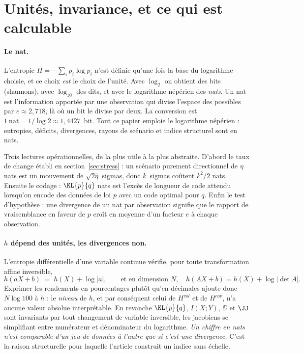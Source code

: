\appendix

\section{Unités, invariance, et ce qui est calculable}
\label{app:units}

\paragraph{Le nat.} L'entropie $H=-\sum_i p_i\log p_i$ n'est définie qu'une fois
la base du logarithme choisie, et ce choix \emph{est} le choix de l'unité. Avec
$\log_2$ on obtient des bits (shannons), avec $\log_{10}$ des dits, et avec le
logarithme népérien des \emph{nats}. Un nat est l'information apportée par une
observation qui divise l'espace des possibles par $e\approx2{,}718$, là où un bit
le divise par deux. La conversion est
$1~\text{nat}=1/\log 2\approx1{,}4427$~bit. Tout ce papier emploie le logarithme
népérien : entropies, déficits, divergences, rayons de scénario et indice
structurel sont en nats.

Trois lectures opérationnelles, de la plus utile à la plus abstraite. D'abord le
taux de change établi en section~\ref{sec:stress} : un scénario purement
directionnel de $\eta$ nats est un mouvement de $\sqrt{2\eta}$ sigmas, donc
$k$~sigmas coûtent $k^2/2$ nats. Ensuite le codage : $\KL{p}{q}$ nats est
l'excès de longueur de code attendu lorsqu'on encode des données de loi $p$ avec
un code optimal pour $q$. Enfin le test d'hypothèse : une divergence de un nat
par observation signifie que le rapport de vraisemblance en faveur de $p$ croît
en moyenne d'un facteur $e$ à chaque observation.

\paragraph{$h$ dépend des unités, les divergences non.} L'entropie différentielle
d'une variable continue vérifie, pour toute transformation affine inversible,
\begin{equation}
\label{eq:h-scaling}
h(aX+b) \;=\; h(X) + \log|a| ,
\qquad\text{et en dimension } N,\quad h(AX+b)=h(X)+\log|\det A| .
\end{equation}
Exprimer les rendements en pourcentages plutôt qu'en décimales ajoute donc
$N\log 100$ à $h$ : le \emph{niveau} de $h$, et par conséquent celui de
$H^{vol}$ et de $H^{cov}$, n'a aucune valeur absolue interprétable. En revanche
$\KL{p}{q}$, $I(X;Y)$, $\DD$ et $\JJ$ sont invariants par tout changement de
variable inversible, les jacobiens se simplifiant entre numérateur et
dénominateur du logarithme. \emph{Un chiffre en nats n'est comparable d'un jeu
de données à l'autre que si c'est une divergence.} C'est la raison structurelle
pour laquelle l'article construit un indice sans échelle.

